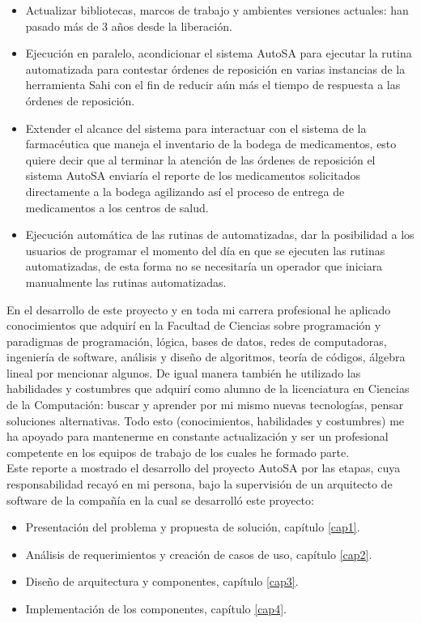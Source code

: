 \begin{itemize}
	\item Actualizar bibliotecas, marcos de trabajo y ambientes versiones actuales: han pasado más de 3 años desde la liberación.
	\item Ejecución en paralelo, acondicionar el sistema AutoSA para ejecutar la rutina automatizada para contestar órdenes de reposición en varias instancias de la herramienta Sahi con el fin de reducir aún más el tiempo de respuesta a las órdenes de reposición.
	\item Extender el alcance del sistema para interactuar con el sistema de la farmacéutica que maneja el inventario de la bodega de medicamentos, esto quiere decir que al terminar la atención de las órdenes de reposición el sistema AutoSA enviaría el reporte de los medicamentos solicitados directamente a la bodega agilizando así el proceso de entrega de medicamentos a los centros de salud. 
	\item Ejecución automática de las rutinas de automatizadas, dar la posibilidad a los usuarios de programar el momento del día en que se ejecuten las rutinas automatizadas, de esta forma no se necesitaría un operador que iniciara manualmente las rutinas automatizadas.
\end{itemize}
En el desarrollo de este proyecto y en toda mi carrera profesional he aplicado conocimientos que adquirí en la Facultad de Ciencias sobre programación y paradigmas de programación, lógica, bases de datos, redes de computadoras, ingeniería de software, análisis y diseño de algoritmos, teoría de códigos, álgebra lineal por mencionar algunos. De igual manera también he utilizado las habilidades y costumbres que adquirí como alumno de la licenciatura en Ciencias de la Computación: buscar y aprender por mi mismo nuevas tecnologías, pensar soluciones alternativas. Todo esto (conocimientos, habilidades y costumbres) me ha apoyado para mantenerme en constante actualización y ser un profesional competente en los equipos de trabajo de los cuales he formado parte.\\
Este reporte a mostrado el desarrollo del proyecto AutoSA por las etapas, cuya responsabilidad recayó en mi persona, bajo la supervisión de un arquitecto de software de la compañía en la cual se desarrolló este proyecto:
\begin{itemize}
 	\item Presentación del problema y propuesta de solución, capítulo \ref{cap1}. 
 	\item Análisis de requerimientos y creación de casos de uso, capítulo \ref{cap2}.
 	\item Diseño de arquitectura y componentes, capítulo \ref{cap3}.
 	\item Implementación de los componentes, capítulo \ref{cap4}.
\end{itemize} 
